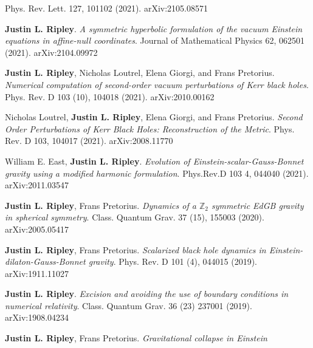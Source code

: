 \documentclass{my_cv}
\begin{document}
\begin{etaremune}
   Phys. Rev. Lett. 127, 101102 (2021).
   arXiv:2105.08571
\item {\bf Justin L. Ripley}. 
   \emph{A symmetric hyperbolic formulation of the vacuum
      Einstein equations in affine-null coordinates}.
   Journal of Mathematical Physics 62, 062501 (2021).
   arXiv:2104.09972
\item {\bf Justin L. Ripley}, 
   Nicholas Loutrel, Elena Giorgi, and Frans Pretorius. 
   \emph{Numerical computation of second-order vacuum perturbations of
      Kerr black holes}.
   Phys. Rev. D 103 (10), 104018 (2021). 
   arXiv:2010.00162
\item Nicholas Loutrel, {\bf Justin L. Ripley}, 
   Elena Giorgi, and Frans Pretorius. 
   \emph{Second Order Perturbations of Kerr Black Holes: Reconstruction of
      the Metric}.
   Phys. Rev. D 103, 104017 (2021).
   arXiv:2008.11770
\item William E. East, {\bf Justin L. Ripley}. 
   \emph{Evolution of Einstein-scalar-Gauss-Bonnet gravity
      using a modified harmonic formulation}.
   Phys.Rev.D 103 4, 044040 (2021).
   arXiv:2011.03547
\item {\bf Justin L. Ripley}, Frans Pretorius. 
   \emph{Dynamics of a $\mathbb{Z}_2$ symmetric EdGB gravity in
      spherical symmetry}.
   Class. Quantum Grav. 37 (15), 155003 (2020).
   arXiv:2005.05417
\item {\bf Justin L. Ripley}, Frans Pretorius. 
   \emph{Scalarized black hole dynamics in
      Einstein-dilaton-Gauss-Bonnet gravity}.
   Phys. Rev. D 101 (4), 044015 (2019).
   arXiv:1911.11027
\item {\bf Justin L. Ripley}. 
   \emph{Excision and avoiding the use of boundary conditions
      in numerical relativity}.
   Class. Quantum Grav. 36 (23) 237001 (2019).  
   arXiv:1908.04234
\item {\bf Justin L. Ripley}, Frans Pretorius. 
   \emph{Gravitational collapse in Einstein
}
\end{etaremune}
\end{document}

